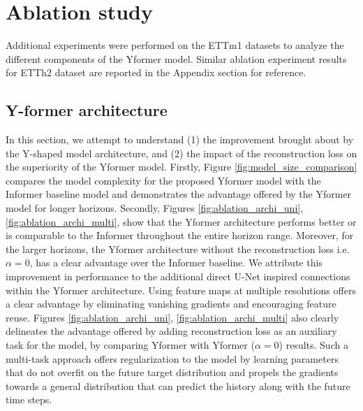 \section{Ablation study}
\label{sec:ablation}

Additional experiments were performed on the ETTm1 datasets to analyze the different components of the Yformer model. Similar ablation experiment results for ETTh2 dataset are reported in the Appendix section for reference.

\subsection{Y-former architecture}

In this section, we attempt to understand (1) the improvement brought about by the Y-shaped model architecture, and (2) the impact of the reconstruction loss on the superiority of the Yformer model. Firstly, Figure \ref{fig:model_size_comparison} compares the model complexity for the proposed Yformer model with the Informer baseline model and demonstrates the advantage offered by the Yformer model for longer horizons. Secondly, Figures \ref{fig:ablation_archi_uni}, \ref{fig:ablation_archi_multi}, show that the Yformer architecture performs better or is comparable to the Informer throughout the entire horizon range. Moreover, for the larger horizons, the Yformer architecture without the reconstruction loss i.e. $\alpha=0$, has a clear advantage over the Informer baseline. We attribute this improvement in performance to the additional direct U-Net inspired connections within the Yformer architecture. Using feature maps at multiple resolutions offers a clear advantage by eliminating vanishing gradients and encouraging feature reuse. Figures \ref{fig:ablation_archi_uni}, \ref{fig:ablation_archi_multi} also clearly delineates the advantage offered by adding reconstruction loss as an auxiliary task for the model, by comparing Yformer with Yformer ($\alpha=0$) results. Such a multi-task approach offers regularization to the model by learning parameters that do not overfit on the future target distribution and propels the gradients towards a general distribution that can predict the history along with the future time steps.


